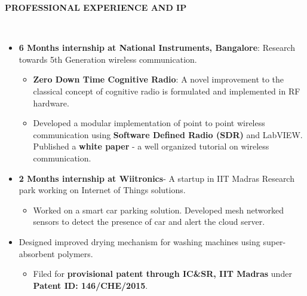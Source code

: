 \documentclass[a4paper,10pt]{article}
\newcommand{\lsep}{-0.5cm}
\newcommand{\resheading}[1]{{\small \colorbox{mygrey}{\begin{minipage}{0.975\textwidth}{\textbf{#1 \vphantom{p\^{E}}}}\end{minipage}}}}
\begin{document}

\resheading{\textbf{PROFESSIONAL EXPERIENCE AND IP} }\\[\lsep]
    \begin{itemize}
            \item \textbf{6 Months internship at National Instruments, Bangalore}: Research towards 5th Generation wireless communication.
        \begin{itemize}
            \vspace{-5pt}
            \item \textbf{Zero Down Time Cognitive Radio}: A novel improvement to the classical concept of cognitive radio is formulated and implemented in RF hardware.
            \item Developed a modular implementation of point to point wireless communication using \textbf{Software Defined Radio (SDR)} and LabVIEW. Published a \textbf{white paper} - a well organized tutorial on wireless communication.\vspace{-5pt}
        \end{itemize}
        \item \textbf{2 Months internship at Wiitronics}- A startup in IIT Madras Research park working on Internet of Things solutions.\vspace{-5pt}
        \begin{itemize}
            \setlength{\itemsep}{1pt}
            \item Worked on a smart car parking solution. Developed mesh networked sensors to detect the presence of car and alert the cloud server.\vspace{-5pt}
        \end{itemize}
        \item Designed improved drying mechanism for washing machines using super-absorbent polymers.
        \begin{itemize}
            \vspace{-5pt}
            \item Filed for \textbf{provisional patent through IC\&SR, IIT Madras} under \textbf{Patent ID: 146/CHE/2015}.
        \end{itemize} 
    \end{itemize}
\end{document}
